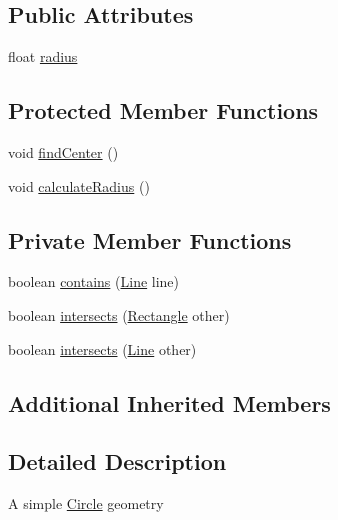 \subsection*{Public Attributes}
\begin{DoxyCompactItemize}
\item 
float \mbox{\hyperlink{classorg_1_1newdawn_1_1slick_1_1geom_1_1_circle_a4ca88ec1c6b329912a60e4dd02ccdf5a}{radius}}
\end{DoxyCompactItemize}
\subsection*{Protected Member Functions}
\begin{DoxyCompactItemize}
\item 
void \mbox{\hyperlink{classorg_1_1newdawn_1_1slick_1_1geom_1_1_circle_ad3edf9b271a6418140800ce60a62132a}{find\+Center}} ()
\item 
void \mbox{\hyperlink{classorg_1_1newdawn_1_1slick_1_1geom_1_1_circle_a48d58271dc65a8c401709864242cdb44}{calculate\+Radius}} ()
\end{DoxyCompactItemize}
\subsection*{Private Member Functions}
\begin{DoxyCompactItemize}
\item 
boolean \mbox{\hyperlink{classorg_1_1newdawn_1_1slick_1_1geom_1_1_circle_a67d90e13c2e9de9c96931295bba962d6}{contains}} (\mbox{\hyperlink{classorg_1_1newdawn_1_1slick_1_1geom_1_1_line}{Line}} line)
\item 
boolean \mbox{\hyperlink{classorg_1_1newdawn_1_1slick_1_1geom_1_1_circle_acccb06500e92cfd3908c49fc4c2f69b7}{intersects}} (\mbox{\hyperlink{classorg_1_1newdawn_1_1slick_1_1geom_1_1_rectangle}{Rectangle}} other)
\item 
boolean \mbox{\hyperlink{classorg_1_1newdawn_1_1slick_1_1geom_1_1_circle_a19abae577442df113b491322444aa93e}{intersects}} (\mbox{\hyperlink{classorg_1_1newdawn_1_1slick_1_1geom_1_1_line}{Line}} other)
\end{DoxyCompactItemize}
\subsection*{Additional Inherited Members}


\subsection{Detailed Description}
A simple \mbox{\hyperlink{classorg_1_1newdawn_1_1slick_1_1geom_1_1_circle}{Circle}} geometry

